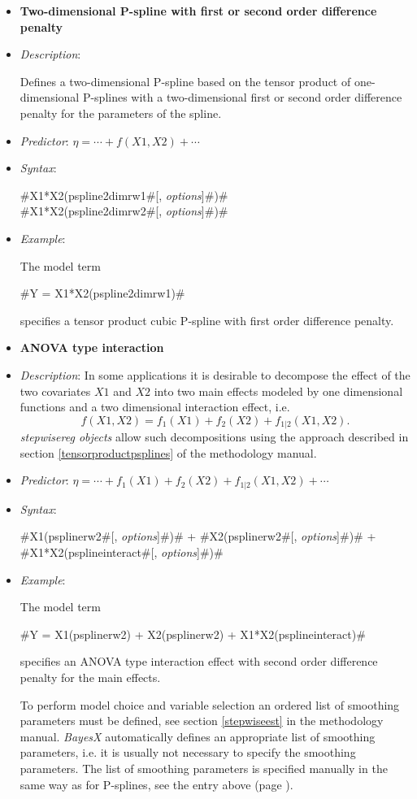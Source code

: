 \begin{itemize}
\item[]{\bf\sffamily Two-dimensional P-spline with first or second order difference penalty}

\item[] {\em Description}:

Defines a two-dimensional P-spline based on the tensor product of
one-dimensional P-splines with a two-dimensional first or second order
difference penalty for the parameters of the spline.
\item[] {\em
Predictor}: $\eta= \cdots + f(X1,X2) + \cdots$ \item[] {\em
Syntax}:

#X1*X2(pspline2dimrw1#[, {\em options}]#)# \\
#X1*X2(pspline2dimrw2#[, {\em options}]#)#
\item[] {\em Example}:

The model term

#Y = X1*X2(pspline2dimrw1)#

specifies a tensor product cubic P-spline with first order difference penalty.
\item[]{\bf\sffamily ANOVA type interaction}

\item[] {\em Description}:
In some applications it is desirable to decompose the effect of the two covariates
$X1$ and $X2$ into two main effects modeled by one dimensional functions and a two dimensional interaction effect, i.e.
\begin{equation}
\label{gampspline_2dimtermmain}
f \left(X1,X2\right) = f_1\left(X1 \right) +
f_2 \left(X2\right) + f_{1|2}\left(X1,X2 \right).
\end{equation}
{\em stepwisereg objects} allow such decompositions using the approach described in section
\autoref{tensorproductpsplines} of the methodology manual.
\item[] {\em
Predictor}: $\eta= \cdots + f_1(X1) + f_2(X2) + f_{1 | 2}(X1,X2) +  \cdots$
\item[] {\em Syntax}:

#X1(psplinerw2#[, {\em options}]#)# + #X2(psplinerw2#[, {\em options}]#)# + \\
#X1*X2(psplineinteract#[, {\em options}]#)#

\item[] {\em Example}:

The model term

#Y = X1(psplinerw2) + X2(psplinerw2) + X1*X2(psplineinteract)#

specifies an ANOVA type interaction effect with  second order difference penalty for the main effects.

To perform model choice and variable selection an ordered list of smoothing parameters must be defined,
see section \autoref{stepwiseest}
in the methodology manual. {\em BayesX} automatically defines an appropriate list of smoothing parameters, i.e. it
is usually not necessary to  specify the smoothing parameters.
The list of smoothing parameters is specified manually in the same way as for P-splines,
see the entry above (page \pageref{psplines_stepwise}).
\end{itemize}



